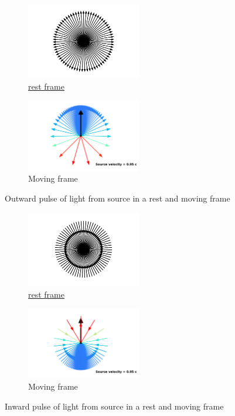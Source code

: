 \begin{figure}[htbp]
	\begin{subfigure}{.49\textwidth}
		\centering
		\includegraphics[width=5cm]{images/pdf/Rest_velocities.pdf}
		\caption{\hyperlink{def-proper-frame}{rest frame}}
	\end{subfigure}
	\begin{subfigure}{.49\textwidth}
		\centering
		\includegraphics[width=5cm]{images/pdf/Aberrated_velocities.pdf}
		\caption{Moving frame}
	\end{subfigure}
	\caption{Outward pulse of light from source in a rest and moving frame}
	\label{fig: outward pulse velocities}
\end{figure}

\begin{figure}[htbp]
	\begin{subfigure}{.49\textwidth}
		\centering
		\includegraphics[width=5cm]{images/pdf/Rest_velocities_inwards.pdf}
		\caption{\hyperlink{def-proper-frame}{rest frame}}
	\end{subfigure}
	\begin{subfigure}{.49\textwidth}
		\centering
		\includegraphics[width=5cm]{images/pdf/Aberrated_velocities_inwards.pdf}
		\caption{Moving frame}
	\end{subfigure}
	\caption{Inward pulse of light from source in a rest and moving frame}
	\label{fig: Realivistic Beaming}
\end{figure}

